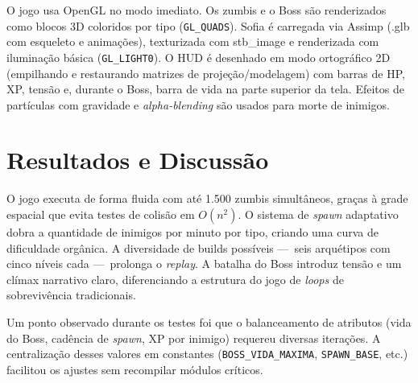 \documentclass[12pt,a4paper]{article}
\begin{document}
O jogo usa OpenGL no modo imediato.
Os zumbis e o Boss são renderizados como blocos 3D coloridos por tipo
(\texttt{GL\_QUADS}).
Sofia é carregada via Assimp (.glb com esqueleto e animações), texturizada
com stb\_image e renderizada com iluminação básica (\texttt{GL\_LIGHT0}).
O HUD é desenhado em modo ortográfico 2D (empilhando e restaurando matrizes
de projeção/modelagem) com barras de HP, XP, tensão e, durante o Boss, barra
de vida na parte superior da tela.
Efeitos de partículas com gravidade e \textit{alpha-blending} são usados
para morte de inimigos.

\section{Resultados e Discussão}



O jogo executa de forma fluida com até 1.500 zumbis simultâneos, graças à
grade espacial que evita testes de colisão em $O(n^2)$.
O sistema de \textit{spawn} adaptativo dobra a quantidade de inimigos por
minuto por tipo, criando uma curva de dificuldade orgânica.
A diversidade de builds possíveis —\ seis arquétipos com cinco níveis cada
—\ prolonga o \textit{replay}.
A batalha do Boss introduz tensão e um clímax narrativo claro, diferenciando
a estrutura do jogo de \textit{loops} de sobrevivência tradicionais.

Um ponto observado durante os testes foi que o balanceamento de atributos
(vida do Boss, cadência de \textit{spawn}, XP por inimigo) requereu diversas
iterações.
A centralização desses valores em constantes (\texttt{BOSS\_VIDA\_MAXIMA},
\texttt{SPAWN\_BASE}, etc.) facilitou os ajustes sem recompilar módulos
críticos.
\end{document}
